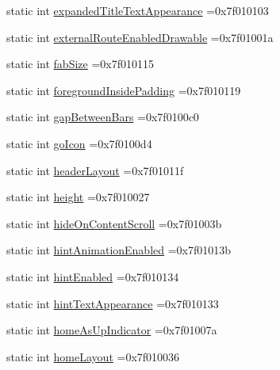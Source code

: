 \begin{DoxyCompactItemize}
static int \hyperlink{classandroid_1_1support_1_1v7_1_1appcompat_1_1R_1_1attr_a6591a675d361c68a12e36dd6fcd3e05b}{expanded\+Title\+Text\+Appearance} =0x7f010103
\item 
static int \hyperlink{classandroid_1_1support_1_1v7_1_1appcompat_1_1R_1_1attr_a413c20085b4ef8fcd95a38eb99a4f30d}{external\+Route\+Enabled\+Drawable} =0x7f01001a
\item 
static int \hyperlink{classandroid_1_1support_1_1v7_1_1appcompat_1_1R_1_1attr_ac6e7b6a3e83161f81bc98d8589e3730f}{fab\+Size} =0x7f010115
\item 
static int \hyperlink{classandroid_1_1support_1_1v7_1_1appcompat_1_1R_1_1attr_ad76026ff556be723d0d119ea4fae113b}{foreground\+Inside\+Padding} =0x7f010119
\item 
static int \hyperlink{classandroid_1_1support_1_1v7_1_1appcompat_1_1R_1_1attr_a0ad90ce19f7d1a362e8a173250778b3b}{gap\+Between\+Bars} =0x7f0100c0
\item 
static int \hyperlink{classandroid_1_1support_1_1v7_1_1appcompat_1_1R_1_1attr_affe769b69f398d52a3cf3637c9303c60}{go\+Icon} =0x7f0100d4
\item 
static int \hyperlink{classandroid_1_1support_1_1v7_1_1appcompat_1_1R_1_1attr_a16960d20392c2e0215098a5eb20f48f2}{header\+Layout} =0x7f01011f
\item 
static int \hyperlink{classandroid_1_1support_1_1v7_1_1appcompat_1_1R_1_1attr_ac0327a7cdb8d8e0b1c7726e150ba0576}{height} =0x7f010027
\item 
static int \hyperlink{classandroid_1_1support_1_1v7_1_1appcompat_1_1R_1_1attr_acd8f7a0451e3e9f87d4b5637d3adcf2f}{hide\+On\+Content\+Scroll} =0x7f01003b
\item 
static int \hyperlink{classandroid_1_1support_1_1v7_1_1appcompat_1_1R_1_1attr_ae3ff8656ab6c146f92c9e92940809add}{hint\+Animation\+Enabled} =0x7f01013b
\item 
static int \hyperlink{classandroid_1_1support_1_1v7_1_1appcompat_1_1R_1_1attr_a25854ee3954a7a1193b311c5af21a879}{hint\+Enabled} =0x7f010134
\item 
static int \hyperlink{classandroid_1_1support_1_1v7_1_1appcompat_1_1R_1_1attr_ae5b2a2b9f322fa06f784d73f1e4ac50c}{hint\+Text\+Appearance} =0x7f010133
\item 
static int \hyperlink{classandroid_1_1support_1_1v7_1_1appcompat_1_1R_1_1attr_a2d0278177bbbefbfdf59fa9761e5b439}{home\+As\+Up\+Indicator} =0x7f01007a
\item 
static int \hyperlink{classandroid_1_1support_1_1v7_1_1appcompat_1_1R_1_1attr_a37c5ccbcfaf034e696f6cde6b0021747}{home\+Layout} =0x7f010036

\end{DoxyCompactItemize}
